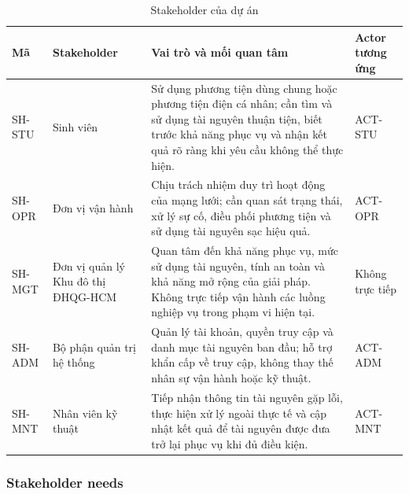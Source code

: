 \begin{table}[htbp]
  \centering
  \caption{Stakeholder của dự án}
  \label{tab:stakeholders}
  \small
  \begin{tabularx}{\textwidth}{|L{20mm}|L{34mm}|Y|L{29mm}|}
    \hline
    \textbf{Mã} & \centering\arraybackslash\textbf{Stakeholder} & \centering\arraybackslash\textbf{Vai trò và mối quan tâm} & \centering\arraybackslash\textbf{Actor tương ứng}\\
    \hline
    SH-STU & Sinh viên & Sử dụng phương tiện dùng chung hoặc phương tiện điện cá nhân; cần tìm và sử dụng tài nguyên thuận tiện, biết trước khả năng phục vụ và nhận kết quả rõ ràng khi yêu cầu không thể thực hiện. & ACT-STU\\
    \hline
    SH-OPR & Đơn vị vận hành & Chịu trách nhiệm duy trì hoạt động của mạng lưới; cần quan sát trạng thái, xử lý sự cố, điều phối phương tiện và sử dụng tài nguyên sạc hiệu quả. & ACT-OPR\\
    \hline
    SH-MGT & Đơn vị quản lý Khu đô thị ĐHQG-HCM & Quan tâm đến khả năng phục vụ, mức sử dụng tài nguyên, tính an toàn và khả năng mở rộng của giải pháp. Không trực tiếp vận hành các luồng nghiệp vụ trong phạm vi hiện tại. & Không trực tiếp\\
    \hline
    SH-ADM & Bộ phận quản trị hệ thống & Quản lý tài khoản, quyền truy cập và danh mục tài nguyên ban đầu; hỗ trợ khẩn cấp về truy cập, không thay thế nhân sự vận hành hoặc kỹ thuật. & ACT-ADM\\
    \hline
    SH-MNT & Nhân viên kỹ thuật & Tiếp nhận thông tin tài nguyên gặp lỗi, thực hiện xử lý ngoài thực tế và cập nhật kết quả để tài nguyên được đưa trở lại phục vụ khi đủ điều kiện. & ACT-MNT\\
    \hline
  \end{tabularx}
\end{table}

\subsubsection*{Stakeholder needs}


